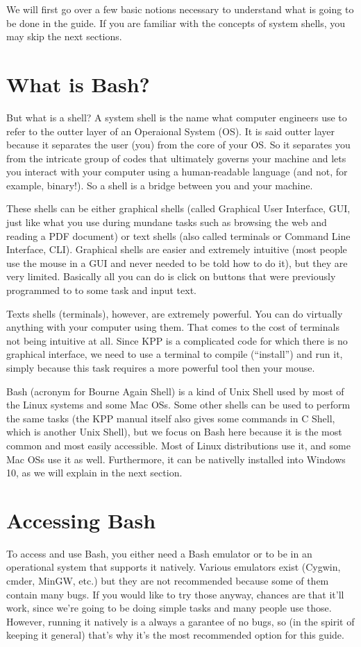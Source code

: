 \documentclass[letterpaper,10pt,openany,oneside]{sphinxmanual}
\begin{document}
We will first go over a few basic notions necessary to understand what is going
to be done in the guide. If you are familiar with the concepts of system shells,
you may skip the next sections.


\section{What is Bash?}
\label{bash:what-is-bash}
But what is a shell? A system shell is the name what computer engineers use to
refer to the outter layer of an Operaional System (OS). It is said outter layer
because it separates the user (you) from the core of your OS. So it separates
you from the intricate group of codes that ultimately governs your machine and
lets you interact with your computer using a human-readable language (and not,
for example, binary!). So a shell is a bridge between you and your machine.

These shells can be either graphical shells (called Graphical User Interface,
GUI, just like what you use during mundane tasks such as browsing the web and
reading a PDF document) or text shells (also called terminals or Command Line
Interface, CLI). Graphical shells are easier and extremely intuitive (most
people use the mouse in a GUI and never needed to be told how to do it), but
they are very limited. Basically all you can do is click on buttons that were
previously programmed to to some task and input text.

Texts shells (terminals), however, are extremely powerful. You can do virtually
anything with your computer using them. That comes to the cost of terminals not
being intuitive at all. Since KPP is a complicated code for which there is no
graphical interface, we need to use a terminal to compile (``install'') and run
it, simply because this task requires a more powerful tool then your mouse.

Bash (acronym for Bourne Again Shell) is a kind of Unix Shell used by most of
the Linux systems and some Mac OSs. Some other shells can be used to perform
the same tasks (the KPP manual itself also gives some commands in C Shell,
which is another Unix Shell), but we focus on Bash here because it is the most
common and most easily accessible.  Most of Linux distributions use it, and
some Mac OSs use it as well. Furthermore, it can be nativelly installed into
Windows 10, as we will explain in the next section.


\section{Accessing Bash}
\label{bash:accessing-bash}
To access and use Bash, you either need a Bash emulator or to be in an
operational system that supports it natively. Various emulators exist (Cygwin,
cmder, MinGW, etc.) but they are not recommended because some of them contain
many bugs. If you would like to try those anyway, chances are that it'll work,
since we're going to be doing simple tasks and many people use those. However,
running it natively is a always a garantee of no bugs, so (in the spirit of
keeping it general) that's why it's the most recommended option for this guide.
\end{document}
